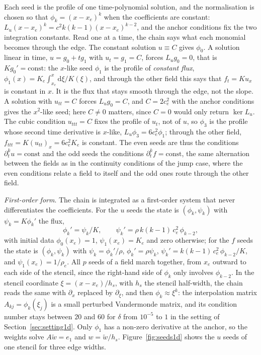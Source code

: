 \documentclass[11pt]{amsart}
\theoremstyle{definition}
\theoremstyle{remark}
\newcommand{\Lu}{L_u}
\newcommand{\px}{\partial_x}
\newcommand{\pt}{\partial_t}
\newcommand{\para}[1]{\par\smallskip\noindent\textit{#1}.\enspace}
\begin{document}
Each seed is the profile of one time-polynomial solution, and the
normalisation is chosen so that $\phi_k = (x - x_e)^k$ when the
coefficients are constant: $\Lu (x - x_e)^k = c^2 k (k - 1) (x - x_e)^{k-2}$,
and the anchor conditions fix the two integration constants. Read one at
a time, the chain says what each monomial becomes through the edge.
The constant solution $u \equiv C$ gives $\phi_0$. A solution linear in
time, $u = g_0 + t g_1$ with $u_t = g_1 = C$, forces $\Lu g_0 = 0$, that
is $K g_0' = \mathrm{const}$: the $x$-like seed $\phi_1$ is the profile
of \emph{constant flux}, $\phi_1(x) = K_e \int_{x_e}^x \mathrm{d}\xi /
K(\xi)$, and through the other field this says that $f_t = K u_x$ is
constant in $x$. It is the flux that stays smooth through the edge, not
the slope. A solution with $u_{tt} = C$ forces $\Lu g_0 = C$, and
$C = 2 c_e^2$ with the anchor conditions gives the $x^2$-like seed; here
$C \ne 0$ matters, since $C = 0$ would only return $\ker \Lu$. The cubic
condition $u_{ttt} = C$ fixes the profile of $u_t$, not of $u$, so
$\phi_3$ is the profile whose second time derivative is $x$-like,
$\Lu \phi_3 = 6 c_e^2 \phi_1$; through the other field,
$f_{ttt} = K (u_{tt})_x = 6 c_e^2 K_e$ is constant. The even seeds are
thus the conditions $\pt^k u = \mathrm{const}$ and the odd seeds the
conditions $\pt^k f = \mathrm{const}$, the same alternation between the
fields as in the continuity conditions of the jump case, where the even
conditions relate a field to itself and the odd ones route through the
other field.

\para{First-order form}
The chain is integrated as a first-order system that never
differentiates the coefficients. For the $u$ seeds the state is
$(\phi_k, \psi_k)$ with $\psi_k = K \phi_k'$ the flux,
\begin{equation}
  \label{eq:firstorder}
  \phi_k' = \psi_k / K, \qquad
  \psi_k' = \rho\, k (k - 1)\, c_e^2\, \phi_{k-2},
\end{equation}
with initial data $\phi_0(x_e) = 1$, $\psi_1(x_e) = K_e$ and zero
otherwise; for the $f$ seeds the state is $(\phi_k, \psi_k)$ with
$\psi_k = \phi_k' / \rho$, $\phi_k' = \rho \psi_k$,
$\psi_k' = k (k - 1)\, c_e^2\, \phi_{k-2} / K$, and $\psi_1(x_e) = 1 /
\rho_e$. All $p$ seeds of a field march together, from $x_e$ outward to
each side of the stencil, since the right-hand side of $\phi_k$ only
involves $\phi_{k-2}$. In the stencil coordinate $\xi = (x - x_e) / h_s$,
with $h_s$ the stencil half-width, the chain reads the same with $\px$
replaced by $\partial_\xi$, and then $\phi_k \approx \xi^k$: the
interpolation matrix $A_{kj} = \phi_k(\xi_j)$ is a small perturbed
Vandermonde matrix, and its condition number stays between $20$ and
$60$ for $\delta$ from $10^{-5}$ to $1$ in the setting of
Section~\ref{sec:setting1d}. Only $\phi_1$ has a non-zero derivative at
the anchor, so the weights solve $A \tilde w = e_1$ and $w = \tilde w /
h_s$. Figure~\ref{fig:seeds1d} shows the $u$ seeds of one stencil for
three edge widths.
\end{document}
